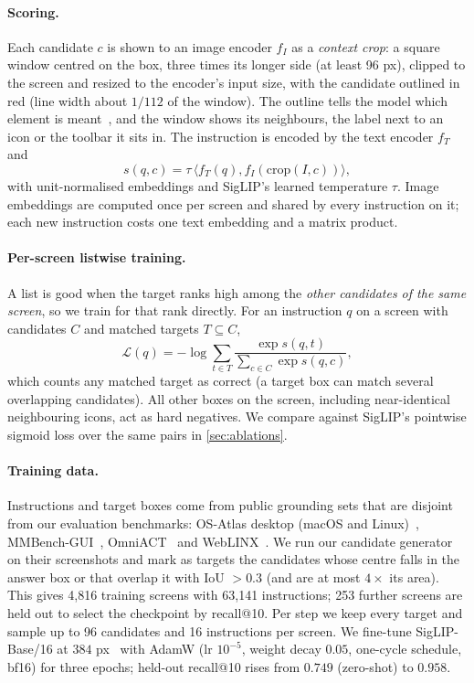 \paragraph{Scoring.}
Each candidate $c$ is shown to an image encoder $f_I$ as a \emph{context crop}: a square window centred on the box,
three times its longer side (at least 96 px), clipped to the screen and resized to the encoder's input size, with
the candidate outlined in red (line width about $1/112$ of the window). The outline tells the model which element
is meant~\cite{shtedritski2023redcircle}, and the window shows its neighbours, \eg the label next to an icon or the
toolbar it sits in. The instruction is encoded by the text encoder $f_T$ and
\begin{equation}
  s(q,c) = \tau\,\langle f_T(q), f_I(\mathrm{crop}(I,c)) \rangle ,
\end{equation}
with unit-normalised embeddings and SigLIP's learned temperature $\tau$. Image embeddings are computed once per
screen and shared by every instruction on it; each new instruction costs one text embedding and a matrix product.

\paragraph{Per-screen listwise training.}
A list is good when the target ranks high among the \emph{other candidates of the same screen}, so we train
for that rank directly. For an instruction $q$ on a screen with candidates $C$ and matched targets $T\subseteq C$,
\begin{equation}
  \mathcal{L}(q) = -\log \sum_{t\in T} \frac{\exp s(q,t)}{\sum_{c\in C} \exp s(q,c)} ,
\end{equation}
which counts any matched target as correct (a target box can match several overlapping candidates). All other
boxes on the screen, including near-identical neighbouring icons, act as hard negatives. We compare against
SigLIP's pointwise sigmoid loss over the same pairs in \cref{sec:ablations}.

\paragraph{Training data.}
Instructions and target boxes come from public grounding sets that are disjoint from our evaluation benchmarks:
OS-Atlas desktop (macOS and Linux)~\cite{wu2024osatlas}, MMBench-GUI~\cite{wang2025mmbenchgui},
OmniACT~\cite{kapoor2024omniact} and WebLINX~\cite{lu2024weblinx}. We run our candidate generator on their
screenshots and mark as targets the candidates whose centre falls in the answer box or that overlap it with
IoU $>0.3$ (and are at most $4\times$ its area). This gives 4{,}816 training screens with 63{,}141 instructions;
253 further screens are held out to select the checkpoint by recall@10. Per step we keep every target and sample
up to 96 candidates and 16 instructions per screen.
We fine-tune SigLIP-Base/16 at $384$ px~\cite{zhai2023siglip} with AdamW (lr $10^{-5}$, weight decay $0.05$,
one-cycle schedule, bf16) for three epochs; held-out recall@10 rises from $0.749$ (zero-shot) to $0.958$.

